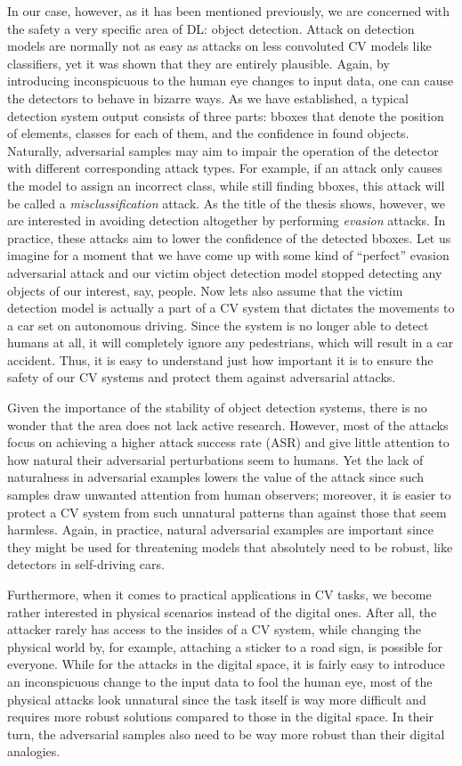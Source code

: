 In our case, however, as it has been mentioned previously, we are concerned with the safety a very specific area of DL: object detection.
Attack on detection models are normally not as easy as attacks on less convoluted CV models like classifiers, yet it was shown that they are entirely plausible.
Again, by introducing inconspicuous to the human eye changes to input data, one can cause the detectors to behave in bizarre ways.
As we have established, a typical detection system output consists of three parts: bboxes that denote the position of elements, classes for each of them, and the confidence in found objects.
Naturally, adversarial samples may aim to impair the operation of the detector with different corresponding attack types.
For example, if an attack only causes the model to assign an incorrect class, while still finding bboxes, this attack will be called a \textit{misclassification} attack.
As the title of the thesis shows, however, we are interested in avoiding detection altogether by performing \textit{evasion} attacks.
In practice, these attacks aim to lower the confidence of the detected bboxes.
Let us imagine for a moment that we have come up with some kind of ``perfect'' evasion adversarial attack and our victim object detection model stopped detecting any objects of our interest, say, people.
Now lets also assume that the victim detection model is actually a part of a CV system that dictates the movements to a car set on autonomous driving.
Since the system is no longer able to detect humans at all, it will completely ignore any pedestrians, which will result in a car accident.
Thus, it is easy to understand just how important it is to ensure the safety of our CV systems and protect them against adversarial attacks.

Given the importance of the stability of object detection systems, there is no wonder that the area does not lack active research.
However, most of the attacks focus on achieving a higher attack success rate (ASR) and give little attention to how natural their adversarial perturbations seem to humans.
Yet the lack of naturalness in adversarial examples lowers the value of the attack since such samples draw unwanted attention from human observers; moreover, it is easier to protect a CV system from such unnatural patterns than against those that seem harmless.
Again, in practice, natural adversarial examples are important since they might be used for threatening models that absolutely need to be robust, like detectors in self-driving cars.

Furthermore, when it comes to practical applications in CV tasks, we become rather interested in physical scenarios instead of the digital ones.
After all, the attacker rarely has access to the insides of a CV system, while changing the physical world by, for example, attaching a sticker to a road sign, is possible for everyone.
While for the attacks in the digital space, it is fairly easy to introduce an inconspicuous change to the input data to fool the human eye, most of the physical attacks look unnatural since the task itself is way more difficult and requires more robust solutions compared to those in the digital space.
In their turn, the adversarial samples also need to be way more robust than their digital analogies.

